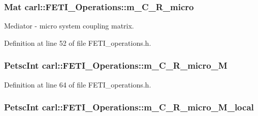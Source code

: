 \subsubsection[{m\+\_\+\+C\+\_\+\+R\+\_\+micro}]{\setlength{\rightskip}{0pt plus 5cm}Mat carl\+::\+F\+E\+T\+I\+\_\+\+Operations\+::m\+\_\+\+C\+\_\+\+R\+\_\+micro\hspace{0.3cm}{\ttfamily [protected]}}\label{classcarl_1_1_f_e_t_i___operations_aa2123fe549c1916496e9ea7e656bb7ee}


Mediator -\/ micro system coupling matrix. 



Definition at line 52 of file F\+E\+T\+I\+\_\+operations.\+h.

\hypertarget{classcarl_1_1_f_e_t_i___operations_a3a6e9ba77124f48329021505abe6a547}{}
\subsubsection[{m\+\_\+\+C\+\_\+\+R\+\_\+micro\+\_\+\+M}]{\setlength{\rightskip}{0pt plus 5cm}Petsc\+Int carl\+::\+F\+E\+T\+I\+\_\+\+Operations\+::m\+\_\+\+C\+\_\+\+R\+\_\+micro\+\_\+\+M\hspace{0.3cm}{\ttfamily [protected]}}\label{classcarl_1_1_f_e_t_i___operations_a3a6e9ba77124f48329021505abe6a547}


Definition at line 64 of file F\+E\+T\+I\+\_\+operations.\+h.

\hypertarget{classcarl_1_1_f_e_t_i___operations_a546bd50866d9e1aa7cab05d688574cfd}{}
\subsubsection[{m\+\_\+\+C\+\_\+\+R\+\_\+micro\+\_\+\+M\+\_\+local}]{\setlength{\rightskip}{0pt plus 5cm}Petsc\+Int carl\+::\+F\+E\+T\+I\+\_\+\+Operations\+::m\+\_\+\+C\+\_\+\+R\+\_\+micro\+\_\+\+M\+\_\+local\hspace{0.3cm}{\ttfamily [protected]}}\label{classcarl_1_1_f_e_t_i___operations_a546bd50866d9e1aa7cab05d688574cfd}


